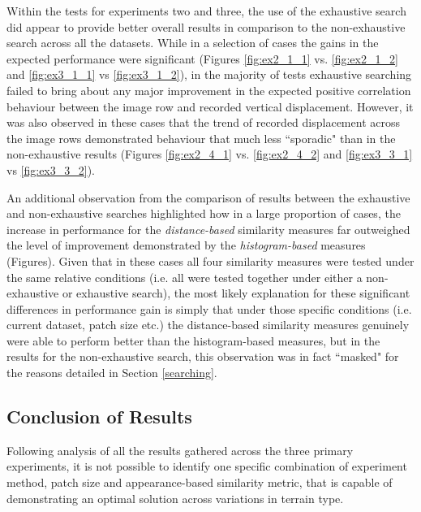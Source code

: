 Within the tests for experiments two and three, the use of the exhaustive search did appear to provide better overall results in comparison to the non-exhaustive search across all the datasets. While in a selection of cases the gains in the expected performance were significant (Figures \ref{fig:ex2_1_1} vs. \ref{fig:ex2_1_2} and  \ref{fig:ex3_1_1} vs \ref{fig:ex3_1_2}), in the majority of tests exhaustive searching failed to bring about any major improvement in the expected positive correlation behaviour between the image row and recorded vertical displacement. However, it was also observed in these cases that the trend of recorded displacement across the image rows demonstrated behaviour that much less ``sporadic" than in the non-exhaustive results (Figures \ref{fig:ex2_4_1} vs. \ref{fig:ex2_4_2} and  \ref{fig:ex3_3_1} vs \ref{fig:ex3_3_2}).

An additional observation from the comparison of results between the exhaustive and non-exhaustive searches highlighted how in a large proportion of cases, the increase in performance for the \textit{distance-based} similarity measures far outweighed the level of improvement demonstrated by the \textit{histogram-based} measures (Figures). Given that in these cases all four similarity measures were tested under the same relative conditions (i.e. all were tested together under either a non-exhaustive or exhaustive search), the most likely explanation for these significant differences in performance gain is simply that under those specific conditions (i.e. current dataset, patch size etc.) the distance-based similarity measures genuinely were able to perform better than the histogram-based measures, but in the results for the non-exhaustive search, this observation was in fact ``masked" for the reasons detailed in Section \ref{searching}.

\subsection{Conclusion of Results}

Following analysis of all the results gathered across the three primary experiments, it is not possible to identify one specific combination of experiment method, patch size and appearance-based similarity metric, that is capable of demonstrating an optimal solution across variations in terrain type.


